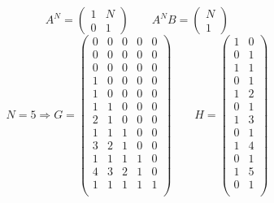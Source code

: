 \documentclass{article}
\begin{document}
\thispagestyle{empty}

$$
A^{N}=\begin{pmatrix} 1 & N \\ 0 & 1\end{pmatrix} \qquad A^N B=\begin{pmatrix}N\\1\end{pmatrix}
$$
$$
N=5 \Rightarrow G=
\begin{pmatrix}
 0&  0&  0&  0&  0\\
 0&  0&  0&  0&  0\\
 0&  0&  0&  0&  0\\
 1&  0&  0&  0&  0\\
 1&  0&  0&  0&  0\\
 1&  1&  0&  0&  0\\
 2&  1&  0&  0&  0\\
 1&  1&  1&  0&  0\\
 3&  2&  1&  0&  0\\
 1&  1&  1&  1&  0\\
 4&  3&  2&  1&  0\\
 1&  1&  1&  1&  1\\
\end{pmatrix}
\qquad H=
\begin{pmatrix}
1&  0\\
0&  1\\
1&  1\\
0&  1\\
1&  2\\
0&  1\\
1&  3\\
0&  1\\
1&  4\\
0&  1\\
1&  5\\
0&  1\\
\end{pmatrix}
$$
\end{document}
